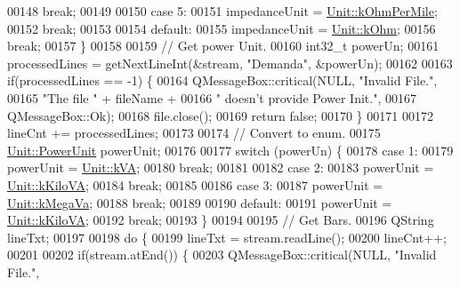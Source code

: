 \begin{DoxyCode}
00148     \textcolor{keywordflow}{break};
00149 
00150   \textcolor{keywordflow}{case} 5:
00151     impedanceUnit = \hyperlink{class_unit_a3747e779c805df24a71961290be3fbdfa1d5bb04c9ecda66b09891af21cd4f613}{Unit::kOhmPerMile};
00152     \textcolor{keywordflow}{break};
00153 
00154   \textcolor{keywordflow}{default}:
00155     impedanceUnit = \hyperlink{class_unit_a3747e779c805df24a71961290be3fbdfa6b9c74d1763eefbaf751eeecff0bd9da}{Unit::kOhm};
00156     \textcolor{keywordflow}{break};
00157   \}
00158 
00159   \textcolor{comment}{// Get power Unit.}
00160   int32\_t powerUn;
00161   processedLines = getNextLineInt(&stream, \textcolor{stringliteral}{"Demanda"}, &powerUn);
00162 
00163   \textcolor{keywordflow}{if}(processedLines == -1) \{
00164     QMessageBox::critical(NULL, \textcolor{stringliteral}{"Invalid File."},
00165                           \textcolor{stringliteral}{"The file "} + fileName +
00166                           \textcolor{stringliteral}{" doesn't provide Power Init."},
00167                           QMessageBox::Ok);
00168     file.close();
00169     \textcolor{keywordflow}{return} \textcolor{keyword}{false};
00170   \}
00171 
00172   lineCnt += processedLines;
00173 
00174   \textcolor{comment}{// Convert to enum.}
00175   \hyperlink{class_unit_ace265ae255370ccacfd5370337572c3b}{Unit::PowerUnit} powerUnit;
00176 
00177   \textcolor{keywordflow}{switch} (powerUn) \{
00178   \textcolor{keywordflow}{case} 1:
00179     powerUnit = \hyperlink{class_unit_ace265ae255370ccacfd5370337572c3ba72b181a842ae2759488a2fa1410d3696}{Unit::kVA};
00180     \textcolor{keywordflow}{break};
00181 
00182   \textcolor{keywordflow}{case} 2:
00183     powerUnit = \hyperlink{class_unit_ace265ae255370ccacfd5370337572c3bac9e5154522fbb810d7aed75c3ff47cb2}{Unit::kKiloVA};
00184     \textcolor{keywordflow}{break};
00185 
00186   \textcolor{keywordflow}{case} 3:
00187     powerUnit = \hyperlink{class_unit_ace265ae255370ccacfd5370337572c3ba6039da0ed20f8bee64305bab8bdec365}{Unit::kMegaVa};
00188     \textcolor{keywordflow}{break};
00189 
00190   \textcolor{keywordflow}{default}:
00191     powerUnit = \hyperlink{class_unit_ace265ae255370ccacfd5370337572c3bac9e5154522fbb810d7aed75c3ff47cb2}{Unit::kKiloVA};
00192     \textcolor{keywordflow}{break};
00193   \}
00194 
00195   \textcolor{comment}{// Get Bars.}
00196   QString lineTxt;
00197 
00198   \textcolor{keywordflow}{do} \{
00199     lineTxt = stream.readLine();
00200     lineCnt++;
00201 
00202     \textcolor{keywordflow}{if}(stream.atEnd()) \{
00203       QMessageBox::critical(NULL, \textcolor{stringliteral}{"Invalid File."},

\end{DoxyCode}
